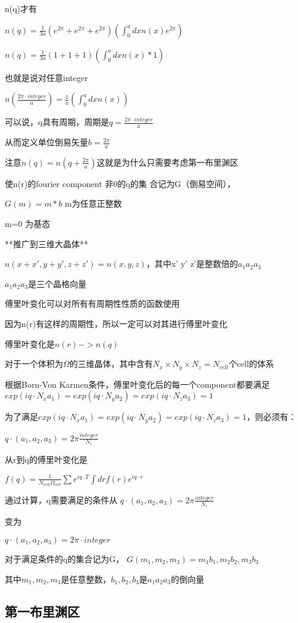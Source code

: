\documentclass{article}
\begin{document}
n(q)才有

$n(q)=\frac{1}{3a}(e^{2\pi}+e^{2\pi}+e^{2\pi})(\int_0^adxn(x)e^{2\pi})$

$n(q)=\frac{1}{3a}(1+1+1)(\int_0^adxn(x)*1)$

也就是说对任意integer

$n(\frac{2\pi · integer}{a})=\frac{1}{a}(\int_0^adxn(x))$

可以说，q具有周期，周期是$q=\frac{2\pi · integer}{a}$



从而定义单位倒易矢量$b=\frac{2\pi}{a}$

注意$n(q)=n(q+\frac{2\pi}{a})$这就是为什么只需要考虑第一布里渊区


使n(r)的fourier component 非0的q的集
合记为G（倒易空间），

$G(m)=m * b$
 m为任意正整数

m=0 为基态

**推广到三维大晶体**


$n(x+x',y+y',z+z')=n(x,y,z)$，其中x' y' z'是整数倍的$a_1 a_2 a_3$

$a_1 a_2 a_3$是三个晶格向量

傅里叶变化可以对所有有周期性性质的函数使用

因为n(r)有这样的周期性，所以一定可以对其进行傅里叶变化

傅里叶变化是$n(r)->n(q)$

对于一个体积为$\Omega$的三维晶体，其中含有$N_x \times N_y \times N_z = N_{cell}$个cell的体系 

根据Born-Von Karmen条件，傅里叶变化后的每一个component都要满足 $exp(iq· N_x a_1)=exp(iq· N_ya_2)=exp(iq· N_z a_3)=1$



为了满足$exp(iq· N_x a_1)=exp(iq· N_ya_2)=exp(iq· N_z a_3)=1$，则必须有：

$q·(a_1,a_2,a_3)=2\pi \frac{integer}{N_i}$

从r到q的傅里叶变化是

$f(q)=\frac{1}{N_{cell}\Omega_{cell}}\sum e^{iq·T} \int drf(r) e^{iq·r}$

通过计算，q需要满足的条件从
$q·(a_1,a_2,a_3)=2\pi \frac{integer}{N_i}$

变为

$q·(a_1,a_2,a_3)=2\pi · integer$

对于满足条件的q的集合记为G，
$G(m_1,m_2,m_3)=m_1b_1,m_2b_2,m_3b_3$

其中$m_1,m_2,m_3$是任意整数，$b_1,b_2,b_3$是$a_1 a_2 a_3$的倒向量

\subsection {第一布里渊区}
\end{document}
